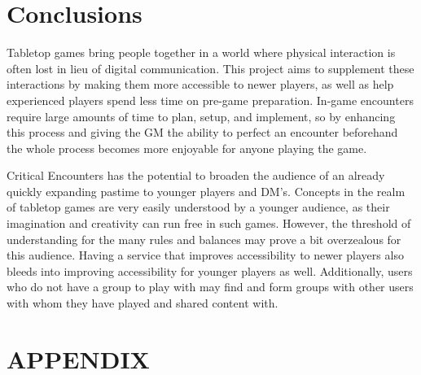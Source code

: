 \documentclass[letterpaper, 10 pt, conference]{ieeeconf}
\begin{document}
\section{Conclusions}

Tabletop games bring people together in a world where physical interaction is
often lost in lieu of digital communication. This project aims to supplement these
interactions by making them more accessible to newer players, as well as help
experienced players spend less time on pre-game preparation. In-game encounters
require large amounts of time to plan, setup, and implement, so by enhancing
this process and giving the GM the ability to perfect an encounter beforehand the
whole process becomes more enjoyable for anyone playing the game.
\par Critical Encounters has the potential to broaden the audience of an already quickly
expanding pastime to younger players and DM’s. Concepts in the realm of tabletop
games are very easily understood by a younger audience, as their imagination and
creativity can run free in such games. However, the threshold of understanding
for the many rules and balances may prove a bit overzealous for this audience.
Having a service that improves accessibility to newer players  also bleeds
into improving accessibility for younger players as well. Additionally, users who
do not have a group to play with may find and form groups with other users with
whom they have played and shared content with.

\section*{APPENDIX}

\listoffigures

\begin{thebibliography}{99}


\end{thebibliography}
\end{document}
